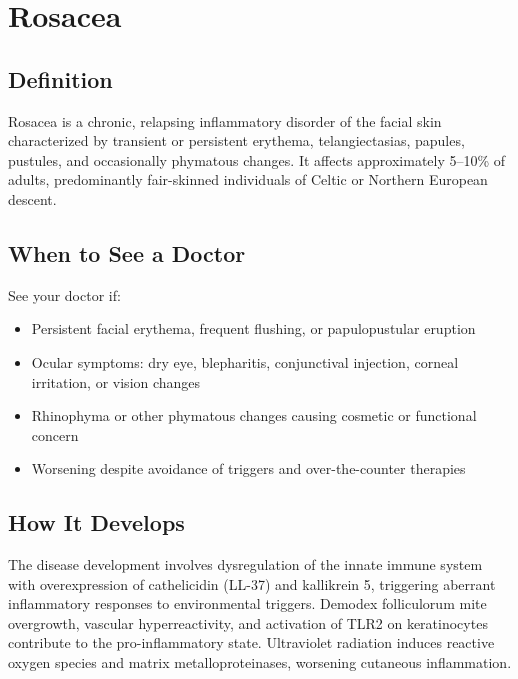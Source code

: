 \chapter{Rosacea}

\section*{Definition}
Rosacea is a chronic, relapsing inflammatory disorder of the facial skin characterized by transient or persistent erythema, telangiectasias, papules, pustules, and occasionally phymatous changes. It affects approximately 5--10\% of adults, predominantly fair-skinned individuals of Celtic or Northern European descent.

\section*{When to See a Doctor}
See your doctor if:
\begin{itemize}
  \item Persistent facial erythema, frequent flushing, or papulopustular eruption
  \item Ocular symptoms: dry eye, blepharitis, conjunctival injection, corneal irritation, or vision changes
  \item Rhinophyma or other phymatous changes causing cosmetic or functional concern
  \item Worsening despite avoidance of triggers and over-the-counter therapies
\end{itemize}

\section*{How It Develops}
The disease development involves dysregulation of the innate immune system with overexpression of cathelicidin (LL-37) and kallikrein 5, triggering aberrant inflammatory responses to environmental triggers. Demodex folliculorum mite overgrowth, vascular hyperreactivity, and activation of TLR2 on keratinocytes contribute to the pro-inflammatory state. Ultraviolet radiation induces reactive oxygen species and matrix metalloproteinases, worsening cutaneous inflammation.

